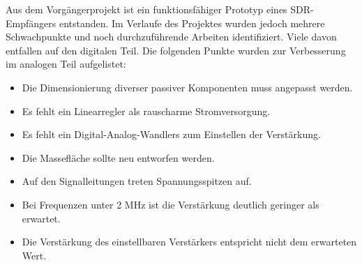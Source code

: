 Aus dem Vorgängerprojekt ist ein funktionsfähiger Prototyp eines SDR-Empfängers entstanden. Im Verlaufe des Projektes wurden jedoch mehrere Schwachpunkte und noch durchzuführende Arbeiten identifiziert. Viele davon entfallen auf den digitalen Teil. Die folgenden Punkte wurden zur Verbesserung im analogen Teil aufgelistet:

\begin{itemize}
	\item Die Dimensionierung diverser passiver Komponenten muss angepasst werden.
	\item Es fehlt ein Linearregler als rauscharme Stromversorgung.
	\item Es fehlt ein Digital-Analog-Wandlers zum Einstellen der Verstärkung.
	\item Die Massefläche sollte neu entworfen werden.
	\item Auf den Signalleitungen treten Spannungsspitzen auf.
	\item Bei Frequenzen unter 2 MHz ist die Verstärkung deutlich geringer als erwartet.
	\item Die Verstärkung des einstellbaren Verstärkers entspricht nicht dem erwarteten Wert.
\end{itemize}
